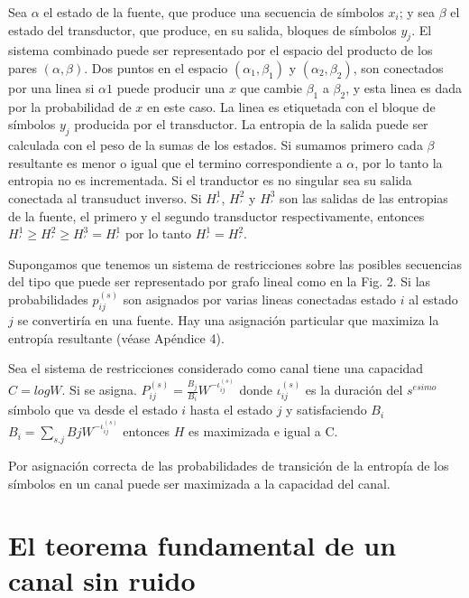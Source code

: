 Sea $\alpha$ el estado de la fuente, que produce una secuencia de s\'{i}mbolos $x_{i}$; y sea $\beta$ el estado del transductor, que produce, en su salida, bloques de s\'{i}mbolos $y_{j}$. El sistema combinado puede ser representado por el espacio del producto de los pares $( \alpha, \beta)$. Dos puntos en el espacio $( \alpha_{1}, \beta_{1})$ y $( \alpha_{2}, \beta_{2})$, son conectados por una linea si $\alpha{1}$ puede producir una $x$ que cambie $\beta_{1}$ a $\beta_{2}$, y esta linea es dada por la probabilidad de $x$ en este caso. La linea es etiquetada con el bloque de s\'{i}mbolos $y_{j}$ producida por el transductor. La entropia de la salida puede ser calculada con el peso de la sumas de los estados. Si sumamos primero cada $\beta$ resultante es menor o igual que el termino correspondiente a $\alpha$, por lo tanto la entropia no es incrementada. Si el tranductor es no singular sea su salida conectada al transuduct inverso. Si $H_{'}^{1}$, $H_{'}^{2}$ y $H_{'}^{3}$ son las salidas de las entropias de la fuente, el primero y el segundo transductor respectivamente, entonces $H_{'}^{1} \geq H_{'}^{2} \geq H_{'}^{3}=H_{'}^{1}$ por lo tanto $H_{'}^{1}=H_{'}^{2}$.

Supongamos que tenemos un sistema de restricciones sobre las posibles secuencias del tipo que puede ser representado por grafo lineal como en la Fig. 2. Si las probabilidades $p_{ij}^{(s)}$ son asignados por varias lineas conectadas estado $i$ al estado $j$ se convertir\'{i}a en una fuente. Hay una asignaci\'{o}n particular que maximiza la entrop\'{i}a resultante (v\'{e}ase Ap\'{e}ndice 4).

\begin{theorem}
\label{th:8}
Sea el sistema de restricciones considerado como canal tiene una capacidad $C = logW$. Si se asigna. $P_{ij}^{(s)} = \frac{B_{j}}{B_{i}}W^{-\iota_{ij}^{(s)}}$ donde $\iota_{ij}^{(s)}$ es la duraci\'{o}n del $s^{esimo}$ s\'{i}mbolo que va desde el estado $i$ hasta el estado $j$ y satisfaciendo $B_{i}$ $B_{i}=\sum_{s.j} B{j}W^{-\iota_{ij}^{(s)}}$ entonces $H$ es maximizada e igual a C.
\end{theorem}

Por asignaci\'{o}n correcta de las probabilidades de transici\'{o}n de la entrop\'{i}a de los s\'{i}mbolos en un canal puede ser maximizada a la capacidad del canal. 

\clearpage

\chapter{El teorema fundamental de un canal sin ruido}
\label{sec:9}

